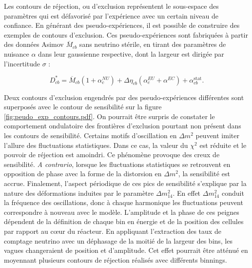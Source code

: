 Les contours de réjection, ou d'exclusion représentent le sous-espace des paramètres qui est défavorisé par l'expérience avec un certain niveau de confiance. En générant des pseudo-expériences, il est possible de construire des exemples de contours d'exclusion. Ces pseudo-expériences sont fabriquées à partir des données Asimov $\overline{M}_{cb}$ sans neutrino stérile, en tirant des paramètres de nuisance $\alpha$ dans leur gaussienne respective, dont la largeur est dirigée par l'incertitude $\sigma$ :

\begin{equation}
    D_{cb}^* = \overline{M}_{cb}\left(1 + \alpha^{NU}_c\right) + \Delta \eta_{cb}\left(\alpha^{EU}_c + \alpha^{EC}\right) + \alpha^\textrm{stat}_{cb}.
\end{equation}

\bigbreak

Deux contours d'exclusion engendrés par des pseudo-expériences différentes sont superposés avec le contour de sensibilité sur la figure \ref{fig:peudo_exp_contours.pdf}. On pourrait être surpris de constater le comportement ondulatoire des frontières d'exclusion pourtant non présent dans les contours de sensibilité. Certains motifs d'oscillation en $\Delta m^2$ peuvent imiter l'allure des fluctuations statistiques. Dans ce cas, la valeur du $\chi^2$ est réduite et le pouvoir de réjection est amoindri. Ce phénomène provoque des \og creux \fg{} de sensibilité. \textit{A contrario}, lorsque les fluctuations statistiques se retrouvent en opposition de phase avec la forme de la distorsion en $\Delta m^2$, la sensibilité est accrue. Finalement, l'aspect périodique de ces pics de sensibilité s'explique par la nature des déformations induites par le paramètre $\Delta m_{14}^2$. En effet $\Delta m_{14}^2$ conduit la fréquence des oscillations, donc à chaque harmonique les fluctuations peuvent correspondre à nouveau avec le modèle. L'amplitude et la phase de ces \og peignes \fg{} dépendent de la définition de chaque bin en énergie et de la position des cellules par rapport au c\oe ur du réacteur. En appliquant l'extraction des taux de comptage neutrino avec un déphasage de la moitié de la largeur des bins, les vagues changeraient de position et d'amplitude. Cet effet pourrait être atténué en moyennant plusieurs contours de réjection réalisés avec différents binnings.\\

